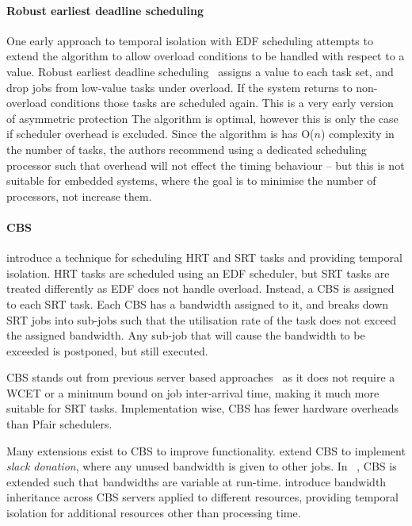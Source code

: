 \paragraph{Robust earliest deadline scheduling}
One early approach to temporal isolation with \gls{EDF} scheduling attempts to extend the 
algorithm to allow overload conditions to be handled with respect to a value. Robust earliest deadline
scheduling~\citep{Buttazzo_Stankovic_93} assigns a value to each task set, and drop jobs from
low-value tasks under overload. If the system returns to non-overload conditions those tasks are
scheduled again. This is a very early version of asymmetric protection
The algorithm is optimal, however this is only the case if
scheduler overhead is excluded.  Since the algorithm is has O($n$) complexity in the number of
tasks, the authors recommend using a dedicated scheduling processor such that overhead will not
effect the timing behaviour -- but this is not suitable for embedded systems, where the goal is to
minimise the number of processors, not increase them.

\paragraph{\Gls{CBS}} \citet{Abeni_Buttazzo_04} introduce a technique for scheduling \gls{HRT} and
\gls{SRT} tasks and providing temporal isolation.  \gls{HRT} tasks are scheduled using an \gls{EDF}
scheduler, but \gls{SRT} tasks are treated differently as \gls{EDF} does not handle overload.
Instead, a \gls{CBS} is assigned to each \gls{SRT} task.  Each \gls{CBS} has a bandwidth assigned to
it, and breaks down \gls{SRT} jobs into sub-jobs such that the utilisation rate of the task does not
exceed the assigned bandwidth.  Any sub-job that will cause the bandwidth to be exceeded is
postponed, but still executed.

\gls{CBS} stands out from previous server based approaches~\citep{Spuri_Buttazzo_96,
Ghazalie_Baker_95, Spuri_Buttazzo_94, Deng_Liu_97} as it does not require a \gls{WCET} or a minimum
bound on job inter-arrival time, making it much more suitable for \gls{SRT} tasks.  Implementation
wise, \gls{CBS} has fewer hardware overheads than Pfair schedulers.

Many extensions exist to \gls{CBS} to improve functionality.  \citet{Kato_IR_11} extend \gls{CBS} to
implement \emph{slack donation}, where any unused bandwidth is given to other jobs.  In
~\citep{Craciunas_KPRS_12}, \gls{CBS} is extended such that bandwidths are variable at run-time.
\citet{Lamastra_LA_01} introduce bandwidth inheritance across CBS servers applied to different
resources, providing temporal isolation for additional resources other than processing time.

